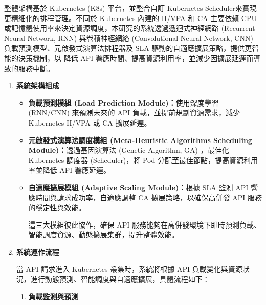 \documentclass[12pt,a4paper]{article}
\begin{document}
\begin{enumerate}[label={(\zhdig*)}, leftmargin=2\parindent, listparindent=\parindent]
\begin{enumerate}[label={(\arabic*)}, leftmargin=\parindent, listparindent=\parindent]
整體架構基於 Kubernetes (K8s) 平台，並整合自訂 Kubernetes Scheduler\cite{18}來實現更精細化的排程管理。不同於 Kubernetes 內建的 H/VPA 和 CA 主要依賴 CPU 或記憶體使用率來決定資源調度\cite{19}，本研究的系統透過遞迴式神經網路 (Recurrent Neural Network, RNN) 與卷積神經網絡 (Convolutional Neural Network, CNN) 負載預測模型、元啟發式演算法排程器及 SLA 驅動的自適應擴展策略，提供更智能的決策機制，以 降低 API 響應時間、提高資源利用率，並減少因擴展延遲而導致的服務中斷。
\begin{enumerate}[label={(\zhdig*)}, leftmargin=\parindent, listparindent=\parindent]
\item \textbf{
系統架構組成}

\begin{itemize}[leftmargin=\parindent, listparindent=\parindent]
    本系統架構主要包含三大核心模組，各自負責不同層級的優化：

    \item \textbf{負載預測模組 (Load Prediction Module)：}使用深度學習 (RNN/CNN) 來預測未來的 API 負載，並提前規劃資源需求，減少 Kubernetes H/VPA 或 CA 擴展延遲。

    \item \textbf{元啟發式演算法調度模組 (Meta-Heuristic Algorithms Scheduling Module)：}透過基因演算法 (Genetic Algorithm, GA) ，最佳化 Kubernetes 調度器 (Scheduler)，將 Pod 分配至最佳節點，提高資源利用率並降低 API 響應延遲。

    \item \textbf{自適應擴展模組 (Adaptive Scaling Module)：}根據 SLA 監測 API 響應時間與請求成功率，自適應調整 CA 擴展策略，以確保高併發 API 服務的穩定性與效能。

    這三大模組彼此協作，確保 API 服務能夠在高併發環境下即時預測負載、智能調度資源、動態擴展集群，提升整體效能。

\end{itemize}

    \item \textbf{
系統運作流程}

當 API 請求進入 Kubernetes 叢集時，系統將根據 API 負載變化與資源狀況，進行動態預測、智能調度與自適應擴展，具體流程如下：
\begin{enumerate}[label={(\arabic*)}, leftmargin=\parindent, listparindent=\parindent]

    \item\textbf{
負載監測與預測}
\begin{itemize}[leftmargin=\parindent, listparindent=\parindent]


\end{itemize}
\end{enumerate}
\end{enumerate}
\end{enumerate}
\end{enumerate}
\end{document}
